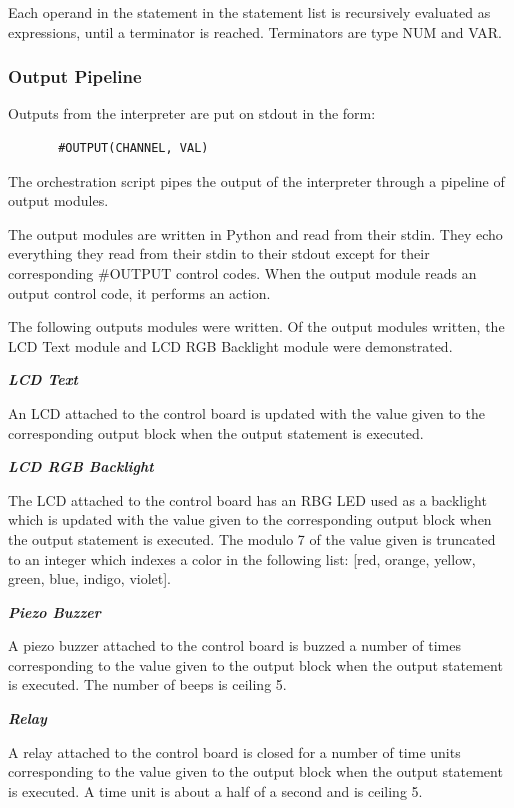 \documentclass[12pt,a4paper]{article}
\begin{document}
      Each operand in the statement in the statement list is recursively evaluated as expressions, until a terminator is reached. Terminators are type NUM and VAR.
      \subsubsection{Output Pipeline}
      
       Outputs from the interpreter are put on stdout in the form: \begin{verbatim}
       #OUTPUT(CHANNEL, VAL)
       \end{verbatim} The orchestration script pipes the output of the interpreter through a pipeline of output modules.
       
       The output modules are written in Python and read from their stdin. They echo everything they read from their stdin to their stdout except for their corresponding \#OUTPUT control codes. When the output module reads an output control code, it performs an action.
       
       The following outputs modules were written. Of the output modules written, the LCD Text module and LCD RGB Backlight module were demonstrated.
       
      \textit{\textbf{LCD Text}}
      
      An LCD attached to the control board is updated with the value given to the corresponding output block when the output statement is executed.
      
      \textit{\textbf{LCD RGB Backlight}}
      
      The LCD attached to the control board has an RBG LED used as a backlight which is updated with the value given to the corresponding output block when the output statement is executed. The modulo 7 of the value given is truncated to an integer which indexes a color in the following list: [red, orange, yellow, green, blue, indigo, violet].
      
      \textit{\textbf{Piezo Buzzer}}
      
      A piezo buzzer attached to the control board is buzzed a number of times corresponding to the value given to the output block when the output statement is executed. The number of beeps is ceiling 5.
      
      \textit{\textbf{Relay}}
      
      A relay attached to the control board is closed for a number of time units corresponding to the value given to the output block when the output statement is executed. A time unit is about a half of a second and is ceiling 5.
      
\end{document}
